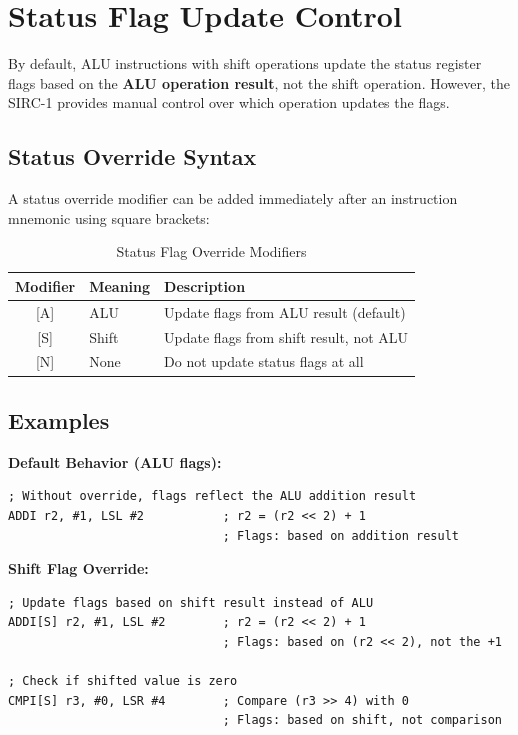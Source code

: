 \section{Status Flag Update Control}
\label{sec:status-override}

By default, ALU instructions with shift operations update the status register flags based on the \textbf{ALU operation
	result}, not the shift operation. However, the SIRC-1 provides manual control over which operation updates the flags.

\subsection{Status Override Syntax}

A status override modifier can be added immediately after an instruction mnemonic using square brackets:

\begin{table}[H]
	\centering
	\begin{tabular}{clp{8cm}}
		\toprule
		\textbf{Modifier} & \textbf{Meaning} & \textbf{Description}                    \\
		\midrule
		{[}A{]}           & ALU              & Update flags from ALU result (default)  \\
		{[}S{]}           & Shift            & Update flags from shift result, not ALU \\
		{[}N{]}           & None             & Do not update status flags at all       \\
		\bottomrule
	\end{tabular}
	\caption{Status Flag Override Modifiers}
	\label{tab:status-override}
\end{table}

\subsection{Examples}

\textbf{Default Behavior (ALU flags):}
\begin{lstlisting}
; Without override, flags reflect the ALU addition result
ADDI r2, #1, LSL #2           ; r2 = (r2 << 2) + 1
                              ; Flags: based on addition result
\end{lstlisting}

\textbf{Shift Flag Override:}
\begin{lstlisting}
; Update flags based on shift result instead of ALU
ADDI[S] r2, #1, LSL #2        ; r2 = (r2 << 2) + 1
                              ; Flags: based on (r2 << 2), not the +1

; Check if shifted value is zero
CMPI[S] r3, #0, LSR #4        ; Compare (r3 >> 4) with 0
                              ; Flags: based on shift, not comparison
\end{lstlisting}

